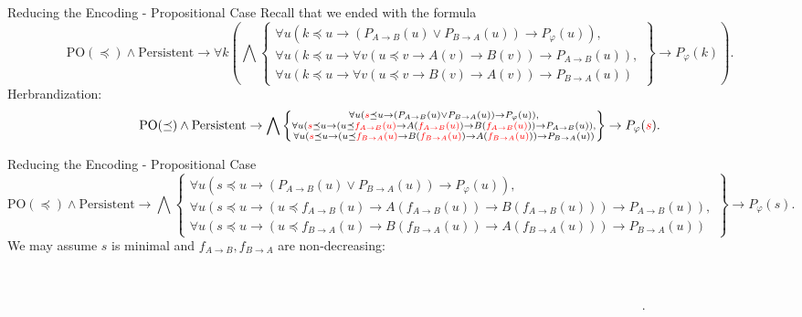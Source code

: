 \documentclass{cubeamer}
\begin{document}
	\begin{frame}{Reducing the Encoding - Propositional Case}
		Recall that we ended with the formula
		$$\text{PO}(\preceq)\wedge\text{Persistent}\to \forall k\left(\bigwedge\left\{\substack{\forall u(k\preceq u\to (P_{A\to B}(u)\vee P_{B\to A}(u))\to P_\varphi(u)),\\ \forall u(k\preceq u\to \forall v(u\preceq v\to A(v)\to B(v))\to P_{A\to B}(u)),\\\forall u(k\preceq u\to \forall v(u\preceq v\to B(v)\to A(v))\to P_{B\to A}(u))}\right\} \to P_\varphi(k)\right).$$
		Herbrandization:
			\[\text{PO}(\preceq)\wedge\text{Persistent}\to \bigwedge\left\{\substack{\forall u({\color{red}s}\preceq u\to (P_{A\to B}(u)\vee P_{B\to A}(u))\to P_\varphi(u)),\\ \forall u({\color{red}s}\preceq u\to (u\preceq {\color{red}f_{A\to B}(u)}\to A({\color{red}f_{A\to B}(u)})\to B({\color{red}f_{A\to B}(u)}))\to P_{A\to B}(u)),\\\forall u({\color{red}s}\preceq u\to (u\preceq  {\color{red}f_{B\to A}(u)}\to B({\color{red}f_{B\to A}(u)})\to A({\color{red}f_{B\to A}(u)}))\to P_{B\to A}(u))}\right\} \to P_\varphi({\color{red}s}).\]
	\end{frame}

	\begin{frame}{Reducing the Encoding - Propositional Case}
		$$\text{PO}(\preceq)\wedge\text{Persistent}\to \bigwedge\left\{\substack{\forall u({s}\preceq u\to (P_{A\to B}(u)\vee P_{B\to A}(u))\to P_\varphi(u)),\\ \forall u({s}\preceq u\to (u\preceq {f_{A\to B}(u)}\to A({f_{A\to B}(u)})\to B({f_{A\to B}(u)}))\to P_{A\to B}(u)),\\\forall u({s}\preceq u\to (u\preceq  {f_{B\to A}(u)}\to B({f_{B\to A}(u)})\to A({f_{B\to A}(u)}))\to P_{B\to A}(u))}\right\} \to P_\varphi({s}).$$
			We may assume $s$ is minimal and $f_{A\to B}, f_{B\to A}$ are non-decreasing:
			\begin{align*}
				&\phantom{\forall k(s\preceq k)\to\forall u(u\preceq f_{A\to B}(u))\to\forall u(u\preceq f_{B\to 	A}(u))\to\text{PO}(\preceq)\wedge\text{Persistent}}\\&\phantom{\to\bigwedge\left\{\substack{\forall u(P_{A\to B}(u)\vee P_{B\to A}(u))\to P_\varphi(u)),\\ \forall u(A(f_{A\to B}(u))\to B(f_{A\to B}(u)))\to P_{A\to B}(u)),\\\forall u((B(f_{B\to A}(u))\to A(f_{B\to A}(u)))\to P_{B\to A}(u))}\right\} \to P_\varphi(s)}.
			\end{align*}
	\end{frame}
\end{document}
